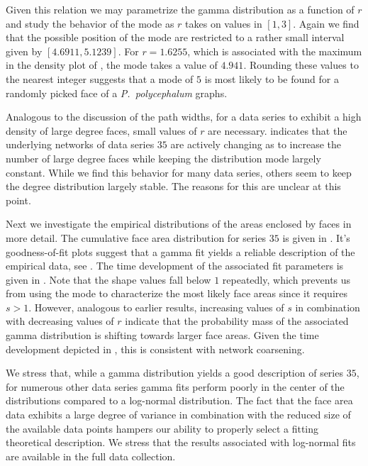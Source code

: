 		Given this relation we may parametrize the gamma distribution as a function of $r$ and study the behavior of the mode as $r$ takes on values in $[1,3]$. Again we find that the possible position of the mode are restricted to a rather small interval given by $[4.6911,5.1239]$. For $r = 1.6255$, which is associated with the maximum in the density plot of , the mode takes a value of $4.941$. Rounding these values to the nearest integer suggests that a mode of $5$ is most likely to be found for a randomly picked face of a \emph{P.~polycephalum} graphs.

		Analogous to the discussion of the path widths, for a data series to exhibit a high density of large degree faces, small values of $r$ are necessary.  indicates that the underlying networks of data series $35$ are actively changing as to increase the number of large degree faces while keeping the distribution mode largely constant. While we find this behavior for many data series, others seem to keep the degree distribution largely stable. The reasons for this are unclear at this point.


		Next we investigate the empirical distributions of the areas enclosed by faces in more detail. The cumulative face area distribution for series $35$ is given in . It's goodness-of-fit plots suggest that a gamma fit yields a reliable description of the empirical data, see . The time development of the associated fit parameters is given in . Note that the shape values fall below $1$ repeatedly, which prevents us from using the mode to characterize the most likely face areas since it requires $s >1$. However, analogous to earlier results, increasing values of $s$ in combination with decreasing values of $r$ indicate that the probability mass of the associated gamma distribution is shifting towards larger face areas. Given the time development depicted in , this is consistent with network coarsening.

		We stress that, while a gamma distribution yields a good description of series $35$, for numerous other data series gamma fits perform poorly in the center of the distributions compared to a log-normal distribution. The fact that the face area data exhibits a large degree of variance in combination with the reduced size of the available data points hampers our ability to properly select a fitting theoretical description. We stress that the results associated with log-normal fits are available in the full data collection.

